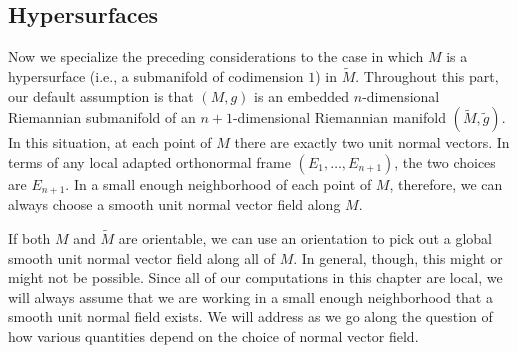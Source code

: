 \subsection{Hypersurfaces}
Now we specialize the preceding considerations to the case in which $M$ is a hypersurface (i.e., a submanifold of codimension $1$) in $\widetilde{M}$. Throughout this part, 
our default assumption is that $(M,g)$ is an embedded $n$-dimensional Riemannian submanifold of an $n+1$-dimensional Riemannian manifold $(\widetilde{M},\tilde{g})$.
In this situation, at each point of $M$ there are exactly two unit normal vectors. In terms of any local adapted orthonormal frame $(E_1,\dots,E_{n+1})$, the two choices 
are $E_{n+1}$. In a small enough neighborhood of each point of $M$, therefore, we can always choose a smooth unit normal vector field along $M$.\par
If both $M$ and $\widetilde{M}$ are orientable, we can use an orientation to pick out a global smooth unit normal vector field along all of $M$. In general, though, 
this might or might not be possible. Since all of our computations in this chapter are local, we will always assume that we are working in a small enough neighborhood 
that a smooth unit normal field exists. We will address as we go along the question of how various quantities depend on the choice of normal vector field.
